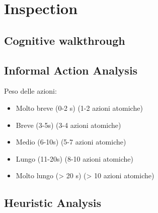 \section{Inspection}
\label{s:inspection}

\subsection{Cognitive walkthrough}
\label{ss:cognitive-walkthrough}








\subsection{Informal Action Analysis}
\label{ss:informal-action-analysis}
Peso delle azioni:
\begin{itemize}
    \item Molto breve (0-2 s) (1-2 azioni atomiche)
    \item Breve (3-5s) (3-4 azioni atomiche)
    \item Medio (6-10s) (5-7 azioni atomiche)
    \item Lungo (11-20s) (8-10 azioni atomiche)
    \item Molto lungo (> 20 s) (> 10 azioni atomiche)
\end{itemize}








\subsection{Heuristic Analysis}
\label{ss:heuristic-analysis}

